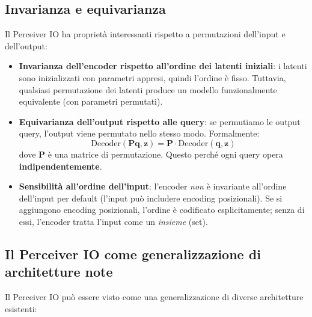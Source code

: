 \documentclass[12pt,a4paper]{article}
\begin{document}
\subsection{Invarianza e equivarianza}

Il Perceiver IO ha propriet\`a interessanti rispetto a permutazioni dell'input e dell'output:

\begin{itemize}
    \item \textbf{Invarianza dell'encoder rispetto all'ordine dei latenti iniziali}: i latenti sono inizializzati con parametri appresi, quindi l'ordine \`e fisso. Tuttavia, qualsiasi permutazione dei latenti produce un modello funzionalmente equivalente (con parametri permutati).

    \item \textbf{Equivarianza dell'output rispetto alle query}: se permutiamo le output query, l'output viene permutato nello stesso modo. Formalmente:
    \[
    \text{Decoder}(\mathbf{P}\mathbf{q}, \mathbf{z}) = \mathbf{P} \cdot \text{Decoder}(\mathbf{q}, \mathbf{z})
    \]
    dove $\mathbf{P}$ \`e una matrice di permutazione. Questo perch\'e ogni query opera \textbf{indipendentemente}.

    \item \textbf{Sensibilit\`a all'ordine dell'input}: l'encoder \emph{non} \`e invariante all'ordine dell'input per default (l'input pu\`o includere encoding posizionali). Se si aggiungono encoding posizionali, l'ordine \`e codificato esplicitamente; senza di essi, l'encoder tratta l'input come un \emph{insieme} (set).
\end{itemize}

\subsection{Il Perceiver IO come generalizzazione di architetture note}

Il Perceiver IO pu\`o essere visto come una generalizzazione di diverse architetture esistenti:
\end{document}
